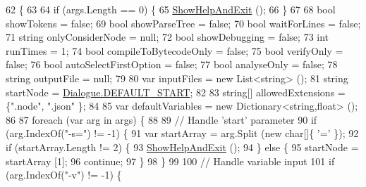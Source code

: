 \begin{DoxyCode}
62         \{
63 
64             \textcolor{keywordflow}{if} (args.Length == 0) \{
65                 \hyperlink{a00106_a0ce7698dabf6d60f3cd33fe5d23c11b3}{ShowHelpAndExit} ();
66             \}
67 
68             \textcolor{keywordtype}{bool} showTokens = \textcolor{keyword}{false};
69             \textcolor{keywordtype}{bool} showParseTree = \textcolor{keyword}{false};
70             \textcolor{keywordtype}{bool} waitForLines = \textcolor{keyword}{false};
71             \textcolor{keywordtype}{string} onlyConsiderNode = null;
72             \textcolor{keywordtype}{bool} showDebugging = \textcolor{keyword}{false};
73             \textcolor{keywordtype}{int} runTimes = 1;
74             \textcolor{keywordtype}{bool} compileToBytecodeOnly = \textcolor{keyword}{false};
75             \textcolor{keywordtype}{bool} verifyOnly = \textcolor{keyword}{false};
76             \textcolor{keywordtype}{bool} autoSelectFirstOption = \textcolor{keyword}{false};
77             \textcolor{keywordtype}{bool} analyseOnly = \textcolor{keyword}{false};
78             \textcolor{keywordtype}{string} outputFile = null;
79 
80             var inputFiles = \textcolor{keyword}{new} List<string> ();
81             \textcolor{keywordtype}{string} startNode = \hyperlink{a00050_a1b643f15f734090e6a58cbf13dafd28f}{Dialogue.DEFAULT\_START};
82 
83             \textcolor{keywordtype}{string}[] allowedExtensions = \{\textcolor{stringliteral}{".node"}, \textcolor{stringliteral}{".json"} \};
84 
85             var defaultVariables = \textcolor{keyword}{new} Dictionary<string,float> ();
86 
87             \textcolor{keywordflow}{foreach} (var arg \textcolor{keywordflow}{in} args) \{
88 
89                 \textcolor{comment}{// Handle 'start' parameter}
90                 \textcolor{keywordflow}{if} (arg.IndexOf(\textcolor{stringliteral}{"-s="}) != -1) \{
91                     var startArray = arg.Split (\textcolor{keyword}{new} \textcolor{keywordtype}{char}[]\{ \textcolor{charliteral}{'='} \});
92                     \textcolor{keywordflow}{if} (startArray.Length != 2) \{
93                         \hyperlink{a00106_a0ce7698dabf6d60f3cd33fe5d23c11b3}{ShowHelpAndExit} ();
94                     \} \textcolor{keywordflow}{else} \{
95                         startNode = startArray [1];
96                         \textcolor{keywordflow}{continue};
97                     \}
98                 \}
99 
100                 \textcolor{comment}{// Handle variable input}
101                 \textcolor{keywordflow}{if} (arg.IndexOf(\textcolor{stringliteral}{"-v"}) != -1) \{

\end{DoxyCode}
